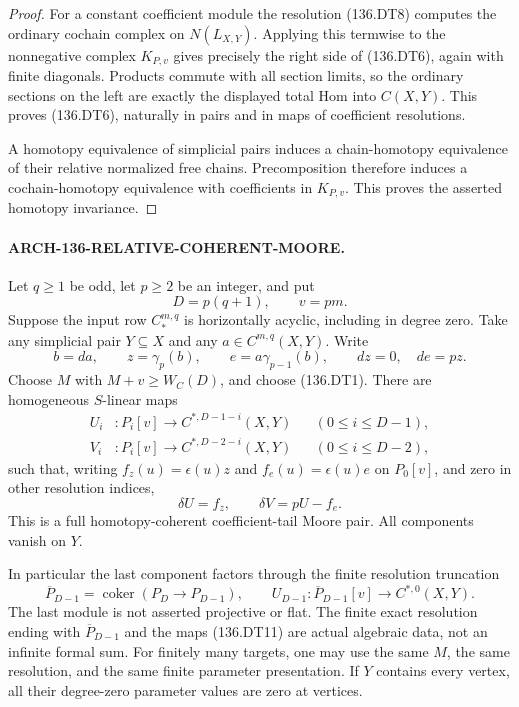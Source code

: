 \begin{proof}
For a constant coefficient module the resolution (136.DT8)
computes the ordinary cochain complex on \(N(L_{X,Y})\).
Applying this termwise to the nonnegative complex \(K_{P,v}\)
gives precisely the right side of (136.DT6), again with finite
diagonals. Products commute with all section limits, so the ordinary
sections on the left are exactly the displayed total Hom into
\(C(X,Y)\). This proves (136.DT6), naturally in pairs and in
maps of coefficient resolutions.

A homotopy equivalence of simplicial pairs induces a chain-homotopy
equivalence of their relative normalized free chains. Precomposition
therefore induces a cochain-homotopy equivalence with coefficients
in \(K_{P,v}\). This proves the asserted homotopy invariance.
\end{proof}

\paragraph{ARCH-136-RELATIVE-COHERENT-MOORE.}
Let \(q\geq1\) be odd, let \(p\geq2\) be an integer, and put
\[
                         D=p(q+1),\qquad v=pm.         \tag{136.DT9}
\]
Suppose the input row \(C_*^{m,q}\) is horizontally acyclic,
including in degree zero. Take any simplicial pair \(Y\subseteq X\)
and any \(a\in C^{m,q}(X,Y)\). Write
\[
 b=da,\qquad z=\gamma_p(b),\qquad
 e=a\gamma_{p-1}(b),\qquad dz=0,\quad de=pz.          \tag{136.DT10}
\]
Choose \(M\) with \(M+v\geq W_C(D)\), and choose (136.DT1).
There are homogeneous \(S\)-linear maps
\[
 \begin{aligned}
 U_i &: P_i[v]\longrightarrow C^{*,D-1-i}(X,Y)
                              &&(0\leq i\leq D-1),\\
 V_i &: P_i[v]\longrightarrow C^{*,D-2-i}(X,Y)
                              &&(0\leq i\leq D-2),
 \end{aligned}                                         \tag{136.DT11}
\]
such that, writing \(f_z(u)=\epsilon(u)z\) and
\(f_e(u)=\epsilon(u)e\) on \(P_0[v]\), and zero in other
resolution indices,
\[
                         \delta U=f_z,\qquad
                         \delta V=pU-f_e.              \tag{136.DT12}
\]
This is a full homotopy-coherent coefficient-tail Moore pair.
All components vanish on \(Y\).

In particular the last component factors through the finite
resolution truncation
\[
 \overline P_{D-1}
        =\operatorname{coker}(P_D\longrightarrow P_{D-1}),
 \qquad U_{D-1}:\overline P_{D-1}[v]
                          \longrightarrow C^{*,0}(X,Y).
                                                        \tag{136.DT13}
\]
The last module is not asserted projective or flat.
The finite exact resolution ending with \(\overline P_{D-1}\)
and the maps (136.DT11) are actual algebraic data, not an infinite
formal sum. For finitely many targets, one may use the same \(M\),
the same resolution, and the same finite parameter presentation.
If \(Y\) contains every vertex, all their degree-zero parameter
values are zero at vertices.

